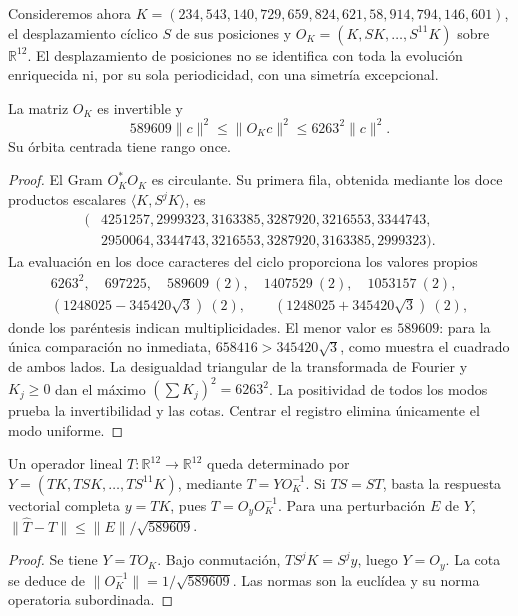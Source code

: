 Consideremos ahora \(K=(234,543,140,729,659,824,621,58,914,794,146,601)\),
el desplazamiento cíclico \(S\) de sus posiciones y
\(O_K=(K,SK,\ldots,S^{11}K)\) sobre \(\mathbb R^{12}\).
El desplazamiento de posiciones no se identifica con toda la evolución
enriquecida ni, por su sola periodicidad, con una simetría excepcional.

\begin{theorem}
\label{v:thm:acoplamiento-orbita}
La matriz \(O_K\) es invertible y
\[
 589609\|c\|^2\leq\|O_Kc\|^2\leq6263^2\|c\|^2.
\]
Su órbita centrada tiene rango once.
\end{theorem}
\begin{proof}
El Gram \(O_K^*O_K\) es circulante. Su primera fila, obtenida mediante
los doce productos escalares \(\langle K,S^jK\rangle\), es
\[
 \begin{aligned}
 (&4251257,2999323,3163385,3287920,3216553,3344743,\\
  &2950064,3344743,3216553,3287920,3163385,2999323).
 \end{aligned}
\]
La evaluación en los doce caracteres del ciclo proporciona los valores
propios
\[
 \begin{gathered}
 6263^2,\quad697225,\quad
 589609\ (2),\quad1407529\ (2),\quad1053157\ (2),\\
 (1248025-345420\sqrt3)\ (2),\qquad
 (1248025+345420\sqrt3)\ (2),
 \end{gathered}
\]
donde los paréntesis indican multiplicidades. El menor valor es
\(589609\): para la única comparación no inmediata,
\(658416>345420\sqrt3\), como muestra el cuadrado de ambos lados.
La desigualdad triangular de la transformada de Fourier y \(K_j\geq0\)
dan el máximo \((\sum K_j)^2=6263^2\).
La positividad de todos los modos prueba la invertibilidad y las cotas.
Centrar el registro elimina únicamente el modo uniforme.
\end{proof}

\begin{corollary}
\label{v:cor:acoplamiento-identificacion}
Un operador lineal \(T:\mathbb R^{12}\to\mathbb R^{12}\) queda determinado por
\(Y=(TK,TSK,\ldots,TS^{11}K)\), mediante \(T=YO_K^{-1}\).
Si \(TS=ST\), basta la respuesta vectorial completa \(y=TK\), pues
\(T=O_yO_K^{-1}\). Para una perturbación \(E\) de \(Y\),
\(\|\widehat T-T\|\leq\|E\|/\sqrt{589609}\).
\end{corollary}
\begin{proof}
Se tiene \(Y=TO_K\). Bajo conmutación, \(TS^jK=S^jy\), luego \(Y=O_y\).
La cota se deduce de
\(\|O_K^{-1}\|=1/\sqrt{589609}\).
Las normas son la euclídea y su norma operatoria subordinada.
\end{proof}

